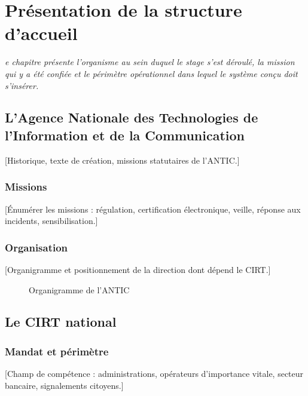\let\textcircled=\pgftextcircled
\chapter{Pr\'esentation de la structure d'accueil}
\label{chap:structure}

\textit{e chapitre pr\'esente l'organisme au sein duquel le stage s'est
d\'eroul\'e, la mission qui y a \'et\'e confi\'ee et le p\'erim\`etre op\'erationnel dans lequel
le syst\`eme con\c cu doit s'ins\'erer.}

\minitoc
\newpage

\section{L'Agence Nationale des Technologies de l'Information et de la Communication}
[Historique, texte de cr\'eation, missions statutaires de l'ANTIC.]

\subsection{Missions}
[\'Enum\'erer les missions : r\'egulation, certification \'electronique, veille,
r\'eponse aux incidents, sensibilisation.]

\subsection{Organisation}
[Organigramme et positionnement de la direction dont d\'epend le CIRT.]

\begin{figure}[H]
    \centering
    \caption{Organigramme de l'ANTIC}
    \label{fig:organigramme}
\end{figure}

\section{Le CIRT national}
\subsection{Mandat et p\'erim\`etre}
[Champ de comp\'etence : administrations, op\'erateurs d'importance vitale, secteur
bancaire, signalements citoyens.]

